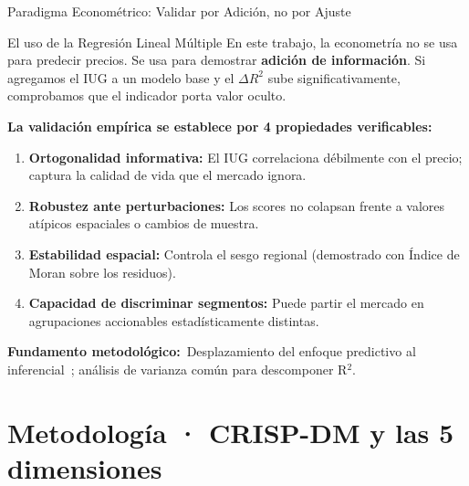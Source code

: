 \documentclass[aspectratio=169,11pt]{beamer}
\newcommand{\hi}[1]{\textcolor{inmuGreen}{\textbf{#1}}}
\newcommand{\framenote}[1]{%
  \vfill
  {\scriptsize\color{inmuMuted}\textbf{Fundamento metodológico:}\ #1}%
}
\begin{document}
\begin{frame}{Paradigma Econométrico: Validar por Adición, no por Ajuste}
  \begin{block}{El uso de la Regresión Lineal Múltiple}
    \small
    En este trabajo, la econometría no se usa para predecir precios. Se usa para demostrar \hi{adición de información}. Si agregamos el IUG a un modelo base y el $\Delta R^2$ sube significativamente, comprobamos que el indicador porta valor oculto.
  \end{block}

  \vspace{0.5em}
  \textbf{La validación empírica se establece por 4 propiedades verificables:}
  \begin{enumerate}
    \item \hi{Ortogonalidad informativa:} El IUG correlaciona débilmente con el precio; captura la calidad de vida que el mercado ignora.
    \item \hi{Robustez ante perturbaciones:} Los scores no colapsan frente a valores atípicos espaciales o cambios de muestra.
    \item \hi{Estabilidad espacial:} Controla el sesgo regional (demostrado con Índice de Moran sobre los residuos).
    \item \hi{Capacidad de discriminar segmentos:} Puede partir el mercado en agrupaciones accionables estadísticamente distintas.
  \end{enumerate}
  \framenote{Desplazamiento del enfoque predictivo al inferencial~\cite{nimon2013}; análisis de varianza común para descomponer R$^2$.}
\end{frame}

\section{Metodología · CRISP-DM y las 5 dimensiones}
\end{document}
